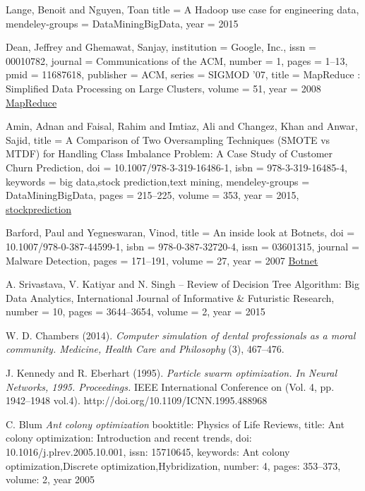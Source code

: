 \documentclass[conference,compsoc]{IEEEtran}
\begin{document}
\begin{thebibliography}{1}
Lange, Benoit and Nguyen, Toan
title = {{A Hadoop use case for engineering data}},
mendeley-groups = {DataMiningBigData},
year = {2015}



Dean, Jeffrey and Ghemawat, Sanjay,
institution = {Google, Inc.},
issn = {00010782},
journal = {Communications of the ACM},
number = {1},
pages = {1--13},
pmid = {11687618},
publisher = {ACM},
series = {SIGMOD '07},
title = {{MapReduce : Simplified Data Processing on Large Clusters}},
volume = {51},
year = {2008}
\href{http://portal.acm.org/citation.cfm?id=1327492}{MapReduce}


Amin, Adnan and Faisal, Rahim and Imtiaz, Ali and Changez, Khan and Anwar, Sajid,
title = {{A Comparison of Two Oversampling Techniques (SMOTE vs MTDF) for Handling Class Imbalance Problem: A Case Study of Customer Churn Prediction}},
doi = {10.1007/978-3-319-16486-1},
isbn = {978-3-319-16485-4},
keywords = {big data,stock prediction,text mining},
mendeley-groups = {DataMiningBigData},
pages = {215--225},
volume = {353},
year = {2015},
\href{http://link.springer.com/10.1007/978-3-319-16486-1}{stockprediction}



Barford, Paul and Yegneswaran, Vinod,
title = {{An inside look at Botnets}},
doi = {10.1007/978-0-387-44599-1},
isbn = {978-0-387-32720-4},
issn = {03601315},
journal = {Malware Detection},
pages = {171--191},
volume = {27},
year = {2007}
\href{http://www.springerlink.com/index/10.1007/978-0-387-44599-1}{Botnet}


A. Srivastava, V. Katiyar and N. Singh -- Review of Decision Tree Algorithm: Big Data Analytics,
International Journal of Informative \& Futuristic Research,
number = {10},
pages = {3644--3654},
volume = {2},
year = {2015}

W. D. Chambers (2014).
\emph{Computer simulation of dental professionals as a moral community. Medicine, Health Care and Philosophy}
(3), 467–476.

J. Kennedy and R. Eberhart (1995). 
\emph{Particle swarm optimization. In Neural Networks, 1995. Proceedings.}
IEEE International Conference on (Vol. 4, pp. 1942–1948 vol.4). http://doi.org/10.1109/ICNN.1995.488968

C. Blum
\emph{Ant colony optimization}
booktitle: {Physics of Life Reviews},
title: {{Ant colony optimization: Introduction and recent trends}},
doi: {10.1016/j.plrev.2005.10.001},
issn: {15710645},
keywords: {Ant colony optimization,Discrete optimization,Hybridization},
number: {4},
pages: {353--373},
volume: {2},
year {2005}


\end{thebibliography}
\end{document}
